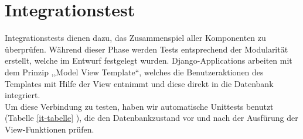 \documentclass[parskip=full,11pt]{scrartcl}
\begin{document}
\begin{longtable}[c]{|p{0.4cm}|P{2.5cm}|p{3.5cm}|p{5cm}|p{3cm}|}
                  
\end{longtable}
\newpage


\section{Integrationstest} \label{integrationtest}
Integrationstests dienen dazu, das Zusammenspiel aller Komponenten zu \"uberpr\"ufen. W\"ahrend dieser Phase werden Tests entsprechend der Modularit\"at erstellt, welche im Entwurf festgelegt wurden. Django-Applications arbeiten mit dem Prinzip ,,Model View Template``, welches die Benutzeraktionen des Templates mit Hilfe der View entnimmt und diese direkt in die Datenbank integriert.\\
Um diese Verbindung zu testen, haben wir automatische Unittests benutzt (Tabelle \ref{it-tabelle} ), die den Datenbankzustand vor und nach der Ausf\"urung der View-Funktionen pr\"ufen.\\
\end{document}
